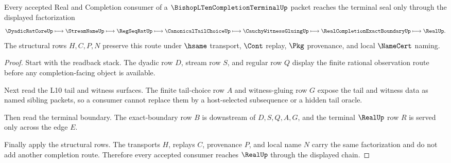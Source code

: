 \begin{theorem}
\label{thm:bishop-l10-completion-terminal-seal-factorization}
Every accepted Real and Completion consumer of a $\BishopLTenCompletionTerminalUp$ packet reaches the terminal seal only through the displayed factorization
$$
\DyadicRatCoreUp \longmapsto
\StreamNameUp \longmapsto
\RegSeqRatUp \longmapsto
\CanonicalTailChoiceUp \longmapsto
\CauchyWitnessGluingUp \longmapsto
\RealCompletionExactBoundaryUp \longmapsto
\RealUp .
$$
The structural rows $H,C,P,N$ preserve this route under $\hsame$ transport, $\Cont$ replay, $\Pkg$ provenance, and local $\NameCert$ naming.
\end{theorem}
\begin{proof}
Start with the readback stack. The dyadic row $D$, stream row $S$, and regular row $Q$ display the finite rational observation route before any completion-facing object is available.

Next read the L10 tail and witness surfaces. The finite tail-choice row $A$ and witness-gluing row $G$ expose the tail and witness data as named sibling packets, so a consumer cannot replace them by a host-selected subsequence or a hidden tail oracle.

Then read the terminal boundary. The exact-boundary row $B$ is downstream of $D,S,Q,A,G$, and the terminal $\RealUp$ row $R$ is served only across the edge $E$.

Finally apply the structural rows. The transports $H$, replays $C$, provenance $P$, and local name $N$ carry the same factorization and do not add another completion route. Therefore every accepted consumer reaches $\RealUp$ through the displayed chain.
\end{proof}

